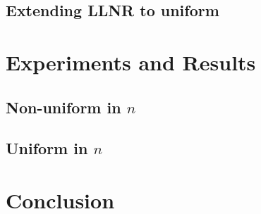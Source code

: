 \documentclass[runningheads,a4paper]{llncs}
\begin{document}
\subsection{Extending LLNR to uniform}

\section{Experiments and Results}

\subsection{Non-uniform in $n$}

\subsection{Uniform in $n$}

\section{Conclusion}



\end{document}
